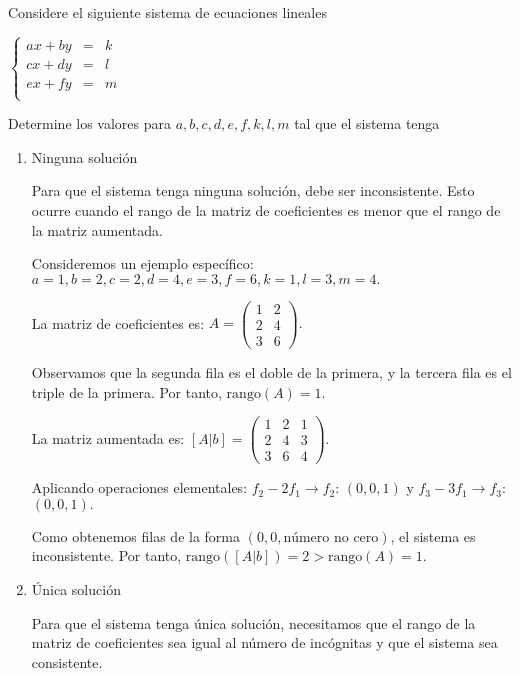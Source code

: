 \begin{prob}  
Considere el siguiente sistema de ecuaciones lineales

$ \left\lbrace \begin{array}{ccc}
ax+by&=&k\\
cx+dy&=&l\\
ex+fy&=&m\\
\end{array} \right.  $

Determine los valores para $a, b, c, d, e, f, k, l, m$ tal que el sistema tenga

\begin{enumerate}[$a)$]
\item Ninguna solución 
\begin{myproof} 
Para que el sistema tenga ninguna solución, debe ser inconsistente. Esto ocurre cuando el rango de la matriz de coeficientes es menor que el rango de la matriz aumentada.

Consideremos un ejemplo específico: $a = 1, b = 2, c = 2, d = 4, e = 3, f = 6, k = 1, l = 3, m = 4.$

La matriz de coeficientes es: $A = \begin{pmatrix}
1 & 2 \\
2 & 4 \\
3 & 6
\end{pmatrix}.$

Observamos que la segunda fila es el doble de la primera, y la tercera fila es el triple de la primera. Por tanto, $\text{rango}(A) = 1$.

La matriz aumentada es: $[A|b] = \begin{pmatrix}
1 & 2 & 1 \\
2 & 4 & 3 \\
3 & 6 & 4
\end{pmatrix}.$

Aplicando operaciones elementales: $f_2 - 2f_1 \rightarrow f_2 $: $(0, 0, 1)$ y $f_3 - 3f_1 \rightarrow f_3$: $(0, 0, 1).$

Como obtenemos filas de la forma $(0, 0, \text{número no cero})$, el sistema es inconsistente.
Por tanto, $\text{rango}([A|b]) = 2 > \text{rango}(A) = 1$.
\end{myproof}

\item Única solución 
\begin{myproof} 
Para que el sistema tenga única solución, necesitamos que el rango de la matriz de coeficientes sea igual al número de incógnitas y que el sistema sea consistente.


\end{myproof}
\end{enumerate}
\end{prob}
